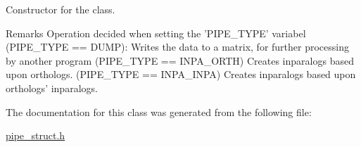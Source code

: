 Constructor for the class. 

\begin{DoxyRemark}{Remarks}
Operation decided when setting the 'PIPE\_\-TYPE' variabel (PIPE\_\-TYPE == DUMP): Writes the data to a matrix, for further processing by another program (PIPE\_\-TYPE == INPA\_\-ORTH) Creates inparalogs based upon orthologs. (PIPE\_\-TYPE == INPA\_\-INPA) Creates inparalogs based upon orthologs' inparalogs. 
\end{DoxyRemark}


The documentation for this class was generated from the following file:\begin{DoxyCompactItemize}
\item 
\hyperlink{pipe__struct_8h}{pipe\_\-struct.h}\end{DoxyCompactItemize}
